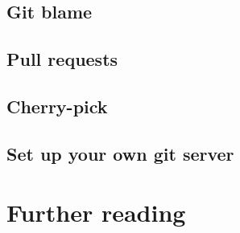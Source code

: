 \documentclass[10pt,a4paper]{beamer}
\begin{document}
\subsection{Git blame}
\begin{frame}

\end{frame}

\subsection{Pull requests}
\begin{frame}

\end{frame}

\subsection{Cherry-pick}
\begin{frame}

\end{frame}

\subsection{Set up your own git server}
\begin{frame}

\end{frame}

\section{Further reading}
\begin{frame}

\end{frame}
\end{document}
